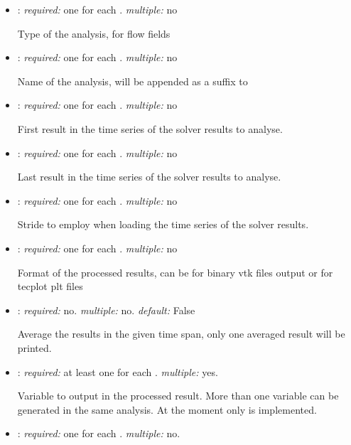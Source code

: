 \begin{itemize}
\item {}: \textit{required:} one for each . \textit{multiple:} no

Type of the analysis,  for flow fields

\item {}: \textit{required:} one for each . \textit{multiple:} no

Name of the analysis, will be appended as a suffix to 

\item {}: \textit{required:} one for each . \textit{multiple:} no

First result in the time series of the solver results to analyse.

\item {}: \textit{required:} one for each . \textit{multiple:} no

Last result in the time series of the solver results to analyse.

\item {}: \textit{required:} one for each . \textit{multiple:} no

Stride to employ when loading the time series of the solver results. 

\item {}: \textit{required:} one for each . \textit{multiple:} no

Format of the processed results, can be  for binary vtk files output or  for tecplot plt files

\item {}: \textit{required:} no. \textit{multiple:} no. \textit{default:} False

Average the results in the given time span, only one averaged result will be printed. 

\item {}: \textit{required:} at least one for each . \textit{multiple:} yes.

Variable to output in the processed result. More than one variable can be generated in the same analysis. At the moment only  is implemented.

\item {}: \textit{required:} one for each . \textit{multiple:} no.


\end{itemize}
